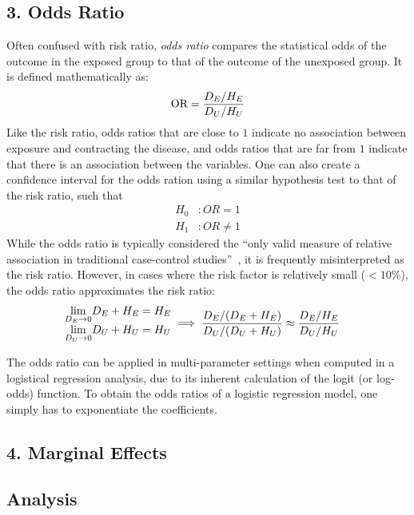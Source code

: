 \subsection{3. Odds Ratio}\label{subsec:odds-ratio}
Often confused with risk ratio, \emph{odds ratio} compares the statistical odds of the outcome in the exposed group to that of the outcome of the unexposed group.
It is defined mathematically as:
\begin{align*}
 \text{OR} = \frac{D_{E} / H_{E}}{D_{U} / H_{U}}
\end{align*}
Like the risk ratio, odds ratios that are close to $1$ indicate no association between exposure and contracting the disease, and odds ratios that are far from $1$ indicate that there is an association between the variables.
One can also create a confidence interval for the odds ration using a similar hypothesis test to that of the risk ratio, such that
\begin{align*}
    H_0&: OR = 1 \\
    H_1&: OR \neq 1
\end{align*}
While the odds ratio is typically considered the \enquote{only valid measure of relative association in traditional case-control studies}~\citep{Relative-Measures-of-Association-for-Binary-Outcomes}, it is frequently misinterpreted as the risk ratio.
However, in cases where the risk factor is relatively small ($< 10 \%$), the odds ratio approximates the risk ratio:
\begin{align*}
    \begin{matrix}
        \underset{D_E \to 0}{\text{lim}} D_E + H_E = H_E \\
        \underset{D_U \to 0}{\text{lim}} D_U + H_U = H_U
    \end{matrix} &\implies \frac{D_{E} / (D_{E} + H_{E})}{D_{U} / (D_{U} + H_{U})} \approx \frac{D_{E} / H_{E}}{D_{U} / H_{U}}
\end{align*}

The odds ratio can be applied in multi-parameter settings when computed in a logistical regression analysis, due to its inherent calculation of the logit (or log-odds) function.
To obtain the odds ratios of a logistic regression model, one simply has to exponentiate the coefficients.


\subsection{4. Marginal Effects}\label{subsec:marginal-effects}

\subsection{Analysis}\label{subsec:analysis}


